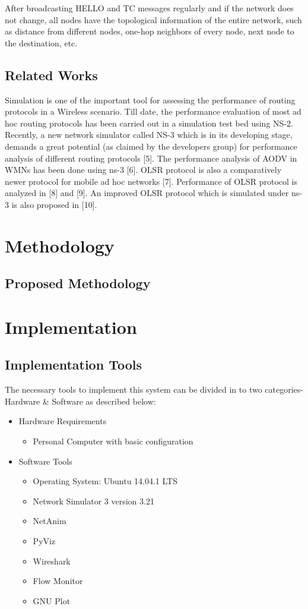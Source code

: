 \documentclass[12pt,a4paper]{report}
\begin{document}
After broadcasting HELLO and TC messages regularly and if the network does
not change, all nodes have the topological information of the entire network, such
as distance from different nodes, one-hop neighbors of every node, next node to the
destination, etc.
\section{Related Works}
Simulation is one of the important tool for assessing the
performance of routing protocols in a Wireless scenario. Till
date, the performance evaluation of most ad hoc routing
protocols has been carried out in a simulation test bed using
NS-2. Recently, a new network simulator called NS-3 which is in its developing stage, demands a great
potential (as claimed by the developers group) for performance analysis of different routing protocols [5].
The performance analysis of AODV in WMNs has been done using ns-3 [6]. OLSR protocol is also a comparatively newer protocol for mobile ad hoc networks [7]. Performance of OLSR protocol is analyzed in [8] and [9]. An improved OLSR protocol which is simulated under ns-3 is also proposed in [10]. 

\chapter{Methodology}

\section{Proposed Methodology}

\chapter{Implementation}

\section{Implementation Tools}
The necessary tools to implement this system can be divided in to two categories-Hardware \& Software as described below:
\begin{itemize}
\item 
Hardware Requirements
\begin{itemize}
\item 
Personal Computer with basic configuration
\end{itemize}
\item 
Software Tools
\begin{itemize}
\item 
Operating System: Ubuntu 14.04.1 LTS
\item 
Network Simulator 3 version 3.21
\item 
NetAnim
\item 
PyViz
\item 
Wireshark
\item 
Flow Monitor
\item 
GNU Plot
\end{itemize}
\end{itemize}
\end{document}
